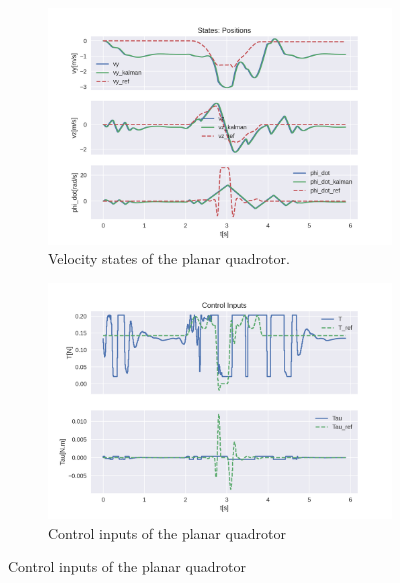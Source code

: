\documentclass{thesisreport}
\begin{document}
\begin{figure}[H]
\medskip
	\begin{subfigure}{0.48\textwidth}
		\includegraphics[width=\linewidth]{Images/acados_simulations/flip_trajectory/planar_quadrotor/noisy/rateStates.png}
		\caption{Velocity states of the planar quadrotor.} \label{fig:flip_planar_sim_velocities_noisy}
	\end{subfigure}\hspace*{\fill}
	\begin{subfigure}{0.48\textwidth}
		\includegraphics[width=\linewidth]{Images/acados_simulations/flip_trajectory/planar_quadrotor/noisy/controlInputs.png}
		\caption{Control inputs of the planar quadrotor} \label{fig:flip_planar_sim_control_inputs_noisy}
	\end{subfigure}


\end{figure}
\end{document}
